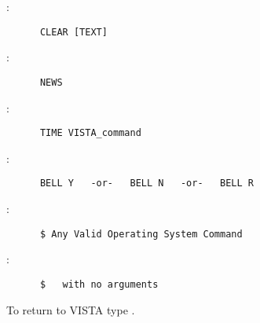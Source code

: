 :
\begin{verbatim}
      CLEAR [TEXT]
\end{verbatim}

\noindent {}:
\begin{verbatim}
      NEWS
\end{verbatim}

\noindent {}:
\begin{verbatim}
      TIME VISTA_command
\end{verbatim}

\noindent {}:
\begin{verbatim}
      BELL Y   -or-   BELL N   -or-   BELL R
\end{verbatim}

\noindent {}:
\begin{verbatim}
      $ Any Valid Operating System Command
\end{verbatim}

\noindent {}:
\begin{verbatim}
      $   with no arguments
\end{verbatim}
To return to VISTA type .


